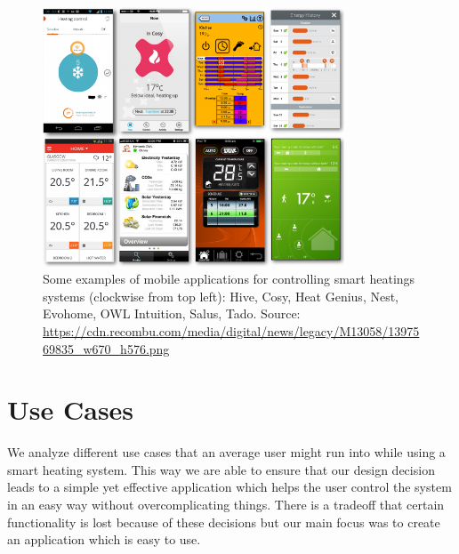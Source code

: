 \begin{figure}
	\begin{center}
		\includegraphics[width=0.8\textwidth]{images/smart_heating_apps.png}
	\end{center}
	\caption{Some examples of mobile applications for controlling smart heatings systems (clockwise from top left): Hive, Cosy, Heat Genius, Nest, Evohome, OWL Intuition, Salus, Tado. Source: \url{https://cdn.recombu.com/media/digital/news/legacy/M13058/1397569835_w670_h576.png}}
	\label{fig:smart_heating_apps}
\end{figure}


\section{Use Cases}
\label{sec:use_cases}

We analyze different use cases that an average user might run into while using a smart heating system. This way we are able to ensure that our design decision leads to a simple yet effective application which helps the user control the system in an easy way without overcomplicating things. There is a tradeoff that certain functionality is lost because of these decisions but our main focus was to create an application which is easy to use. 

